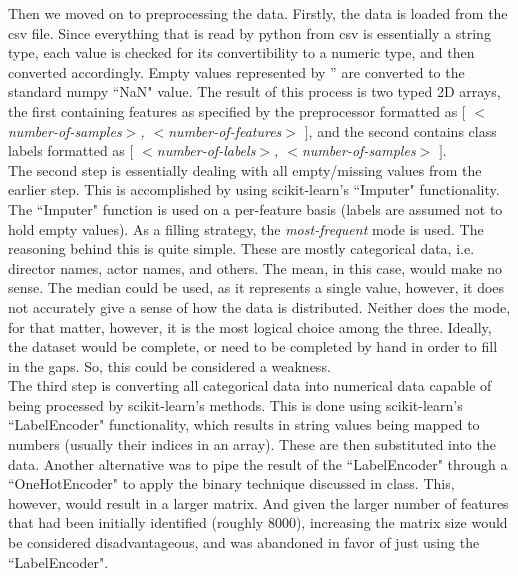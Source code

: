 \documentclass[journal,transmag]{IEEEtran}
\begin{document}
Then we moved on to preprocessing the data. Firstly, the data is loaded from the csv file. Since everything that is read by python from csv is essentially a string type, each value is checked for its convertibility to a numeric type, and then converted accordingly. Empty values represented by '' are converted to the standard numpy ``NaN" value. The result of this process is two typed 2D arrays, the first containing features as specified by the preprocessor formatted as $[$ \textit{$<$number-of-samples$>$, $<$number-of-features$>$} $]$, and the second contains class labels formatted as $[$ \textit{$<$number-of-labels$>$, $<$number-of-samples$>$} $] $.\\
The second step is essentially dealing with all empty/missing values from the earlier step. This is accomplished by using scikit-learn's ``Imputer" functionality. The ``Imputer" function is used on a per-feature basis (labels are assumed not to hold empty values). As a filling strategy, the \textit{most-frequent} mode is used. The reasoning behind this is quite simple. These are mostly categorical data, i.e. director names, actor names, and others. The mean, in this case, would make no sense. The median could be used, as it represents a single value, however, it does not accurately give a sense of how the data is distributed. Neither does the mode, for that matter, however, it is the most logical choice among the three. Ideally, the dataset would be complete, or need to be completed by hand in order to fill in the gaps. So, this could be considered a weakness.\\
The third step is converting all categorical data into numerical data capable of being processed by scikit-learn's methods. This is done using scikit-learn's ``LabelEncoder" functionality, which results in string values being mapped to numbers (usually their indices in an array). These are then substituted into the data. Another alternative was to pipe the result of the ``LabelEncoder" through a ``OneHotEncoder" to apply the binary technique discussed in class. This, however, would result in a larger matrix. And given the larger number of features that had been initially identified (roughly 8000), increasing the matrix size would be considered disadvantageous, and was abandoned in favor of just using the ``LabelEncoder".
\end{document}
